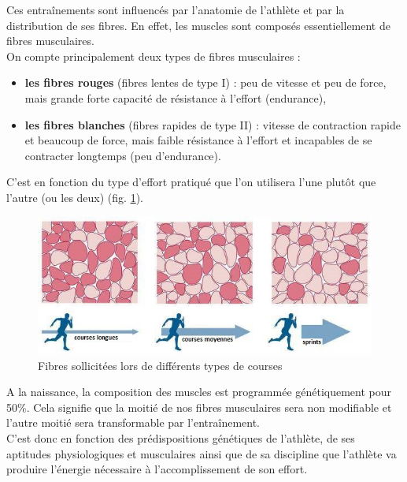         Ces entraînements sont influencés par l'anatomie de l'athlète et par la distribution de ses fibres. En effet, les muscles sont composés essentiellement de fibres musculaires.\\
      
        On compte principalement deux types de fibres musculaires :
        \begin{itemize}
            \item \textbf{les fibres rouges} (fibres lentes de type I) : peu de vitesse et peu de force, mais grande forte capacité de résistance à l’effort (endurance),
            \item \textbf{les fibres blanches} (fibres rapides de type II) : vitesse de contraction rapide et beaucoup de force, mais faible résistance à l’effort et incapables de se contracter longtemps (peu d'endurance).\\
        \end{itemize}
        
        C'est en fonction du type d'effort pratiqué que l'on utilisera l'une plutôt que l'autre (ou les deux) (fig. \ref{fig:fibres}).
        
        \begin{figure}[H]
            \centering
            \includegraphics[scale=0.7]{images/fibres.jpg}
            \caption{\label{fig:fibres}Fibres sollicitées lors de différents types de courses}
        \end{figure}
        
        A la naissance, la composition des muscles est programmée génétiquement pour 50\%. Cela signifie que la moitié de nos fibres musculaires sera non modifiable et l’autre moitié sera transformable par l’entraînement.\\

        C'est donc en fonction des prédispositions génétiques de l'athlète, de ses aptitudes physiologiques et musculaires ainsi que de sa discipline que l'athlète va produire l'énergie nécessaire à l'accomplissement de son effort.\\
      
